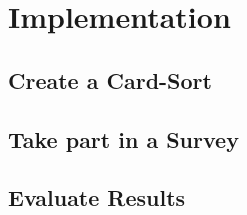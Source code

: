 \chapter{Implementation}

\label{chap:Implem}




\section{Create a Card-Sort}

\section{Take part in a Survey}

\section{Evaluate Results}
